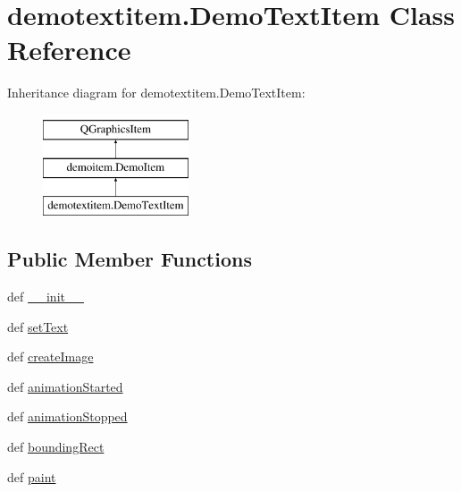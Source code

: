 \hypertarget{classdemotextitem_1_1DemoTextItem}{}\section{demotextitem.\+Demo\+Text\+Item Class Reference}
\label{classdemotextitem_1_1DemoTextItem}
Inheritance diagram for demotextitem.\+Demo\+Text\+Item\+:\begin{figure}[H]
\begin{center}
\leavevmode
\includegraphics[height=3.000000cm]{classdemotextitem_1_1DemoTextItem}
\end{center}
\end{figure}
\subsection*{Public Member Functions}
\begin{DoxyCompactItemize}
\item 
def \hyperlink{classdemotextitem_1_1DemoTextItem_a2d4f0a463a43cf13d2f723dfd92e6ae8}{\+\_\+\+\_\+init\+\_\+\+\_\+}
\item 
def \hyperlink{classdemotextitem_1_1DemoTextItem_ac59375560f1694b22c47118d57aadd66}{set\+Text}
\item 
def \hyperlink{classdemotextitem_1_1DemoTextItem_a95acf8c0f6004b91152809380f049aa7}{create\+Image}
\item 
def \hyperlink{classdemotextitem_1_1DemoTextItem_a4ae788a74979f401863fee2a7fc602b1}{animation\+Started}
\item 
def \hyperlink{classdemotextitem_1_1DemoTextItem_af511014a51a7f58dad586fa5e16c4d55}{animation\+Stopped}
\item 
def \hyperlink{classdemotextitem_1_1DemoTextItem_ac1661205686045a36da15c864ea4c2d9}{bounding\+Rect}
\item 
def \hyperlink{classdemotextitem_1_1DemoTextItem_aaa5674618a8e4520f22d65f6040f0bcd}{paint}
\end{DoxyCompactItemize}
